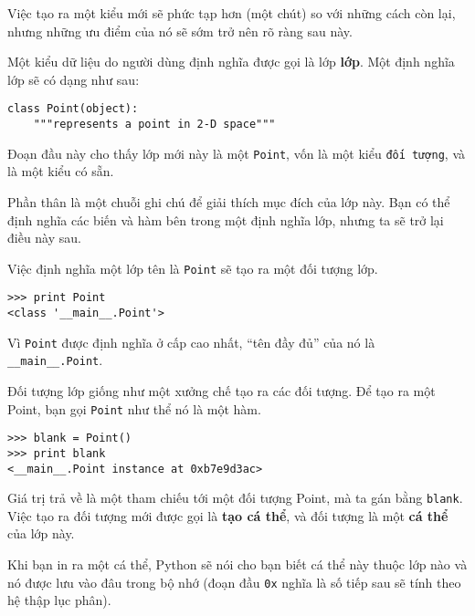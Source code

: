 \documentclass[11pt]{book}
\begin{document}

Việc tạo ra một kiểu mới sẽ phức tạp hơn (một chút) so với những cách còn lại,
nhưng những ưu điểm của nó sẽ sớm trở nên rõ ràng sau này.

Một kiểu dữ liệu do người dùng định nghĩa được gọi là lớp {\bf lớp}.
Một định nghĩa lớp sẽ có dạng như sau:


\beforeverb
\begin{verbatim}
class Point(object):
    """represents a point in 2-D space"""
\end{verbatim}
\afterverb
%
Đoạn đầu này cho thấy lớp mới này là một {\tt Point},
vốn là một kiểu {\tt đối tượng}, và là một kiểu có sẵn.


Phần thân là một chuỗi ghi chú để giải thích mục đích của lớp này.
Bạn có thể định nghĩa các biến và hàm bên trong một định nghĩa lớp,
nhưng ta sẽ trở lại điều này sau.


Việc định nghĩa một lớp tên là {\tt Point} sẽ tạo ra một đối tượng lớp.

\beforeverb
\begin{verbatim}
>>> print Point
<class '__main__.Point'>
\end{verbatim}
\afterverb
%
Vì {\tt Point} được định nghĩa ở cấp cao nhất, ``tên đầy đủ'' của nó
là \verb"__main__.Point".


Đối tượng lớp giống như một xưởng chế tạo ra các đối tượng. Để tạo ra
một Point, bạn gọi {\tt Point} như thể nó là một hàm.

\beforeverb
\begin{verbatim}
>>> blank = Point()
>>> print blank
<__main__.Point instance at 0xb7e9d3ac>
\end{verbatim}
\afterverb
%
Giá trị trả về là một tham chiếu tới một đối tượng Point, mà ta 
gán bằng {\tt blank}.  
Việc tạo ra đối tượng mới được gọi là
{\bf tạo cá thể}, và đối tượng là một {\bf cá thể} của
lớp này.


Khi bạn in ra một cá thể, Python sẽ nói cho bạn biết cá thể này thuộc lớp nào
và nó được lưu vào đâu trong bộ nhớ (đoạn đầu
{\tt 0x} nghĩa là số tiếp sau sẽ tính theo hệ thập lục phân).
\end{document}
